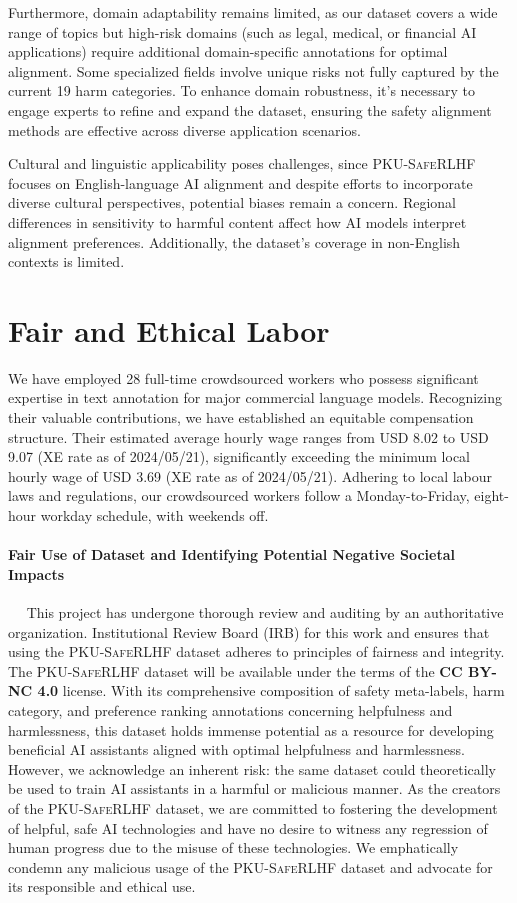 \documentclass[11pt]{article}
\theoremstyle{plain}
\theoremstyle{definition}
\theoremstyle{remark}
\newcommand{\db}{\textsc{PKU-SafeRLHF}}
\begin{document}
Furthermore, domain adaptability remains limited, as our dataset covers a wide range of topics but high-risk domains (such as legal, medical, or financial AI applications) require additional domain-specific annotations for optimal alignment. Some specialized fields involve unique risks not fully captured by the current 19 harm categories. To enhance domain robustness, it's necessary to engage experts to refine and expand the dataset, ensuring the safety alignment methods are effective across diverse application scenarios.

Cultural and linguistic applicability poses challenges, since \db{} focuses on English-language AI alignment and despite efforts to incorporate diverse cultural perspectives, potential biases remain a concern. Regional differences in sensitivity to harmful content affect how AI models interpret alignment preferences. Additionally, the dataset’s coverage in non-English contexts is limited.

\section{Fair and Ethical Labor}
\label{sec:fair}
We have employed 28 full-time crowdsourced workers who possess significant expertise in text annotation for major commercial language models. Recognizing their valuable contributions, we have established an equitable compensation structure. Their estimated average hourly wage ranges from USD 8.02 to USD 9.07 (XE rate as of 2024/05/21), significantly exceeding the minimum local hourly wage of USD 3.69 \citep{noauthor_undated-nz} (XE rate as of 2024/05/21). Adhering to local labour laws and regulations, our crowdsourced workers follow a Monday-to-Friday, eight-hour workday schedule, with weekends off.

\paragraph{Fair Use of Dataset and Identifying Potential Negative Societal Impacts}~~ This project has undergone thorough review and auditing by an authoritative organization. Institutional Review Board (IRB) for this work and ensures that using the \db{} dataset adheres to principles of fairness and integrity. The \db{} dataset will be available under the terms of the \textbf{CC BY-NC 4.0} license. With its comprehensive composition of safety meta-labels, harm category, and preference ranking annotations concerning helpfulness and harmlessness, this dataset holds immense potential as a resource for developing beneficial AI assistants aligned with optimal helpfulness and harmlessness. However, we acknowledge an inherent risk: the same dataset could theoretically be used to train AI assistants in a harmful or malicious manner. As the creators of the \db{} dataset, we are committed to fostering the development of helpful, safe AI technologies and have no desire to witness any regression of human progress due to the misuse of these technologies. We emphatically condemn any malicious usage of the \db{} dataset and advocate for its responsible and ethical use.
\end{document}
